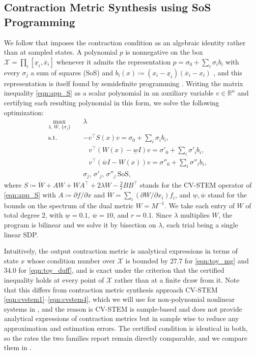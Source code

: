 \documentclass[lettersize,journal]{IEEEtran}
\begin{document}
\subsection{Contraction Metric Synthesis using SoS Programming}
We follow \cite{aylward2008stability} that imposes the contraction condition as an algebraic identity rather than at sampled states. 
A polynomial $p$ is nonnegative on the box $\mathcal{X} = \prod_i [\underline{x}_i, \overline{x}_i]$ 
whenever it admits the representation $p = \sigma_0 + \sum_i \sigma_i b_i$ 
with every $\sigma_j$ a sum of squares (SoS) and $b_i(x) \coloneq (x_i - \underline{x}_i)(\overline{x}_i - x_i)$ \cite{putinar1993positive}, 
and this representation is itself found by semidefinite programming \cite{parrilo2000structured}. 
Writing the matrix inequality \eqref{eqn:app_S} as a scalar polynomial in an auxiliary variable $v \in \mathbb{R}^n$ 
and certifying each resulting polynomial in this form, we solve the following optimization:
\begin{equation}\label{eqn:toy_sos}
    \begin{aligned}
        \max_{\lambda, \, W, \, \{\sigma_j\}} \quad & \lambda \\
        \text{s.t.} \quad
        & -v^\top S(x) v = \sigma_0 + \textstyle\sum_i \sigma_i b_i, \\
        & \;\;\; v^\top (W(x) - \underline{w} I) v = \sigma'_0 + \textstyle\sum_i \sigma'_i b_i, \\
        & \;\;\; v^\top (\overline{w} I - W(x)) v = \sigma''_0 + \textstyle\sum_i \sigma''_i b_i, \\
        & \sigma_j, \, \sigma'_j, \, \sigma''_j \ \text{SoS},
    \end{aligned}
\end{equation}
where $S \coloneq \dot{W} + AW + WA^\top + 2\lambda W - \tfrac{2}{r}BB^\top$ stands for the CV-STEM operator of \eqref{eqn:app_S} 
with $A \coloneq \partial f / \partial x$ and $\dot{W} = \sum_i (\partial W / \partial x_i) f_i$, 
and $\underline{w}, \overline{w}$ stand for the bounds on the spectrum of the dual metric $W = M^{-1}$. 
We take each entry of $W$ of total degree $2$, with $\underline{w} = 0.1$, $\overline{w} = 10$, and $r = 0.1$. 
Since $\lambda$ multiplies $W$, the program is bilinear and we solve it by bisection on $\lambda$, 
each trial being a single linear SDP.

Intuitively, the output contraction metric is analytical expressions in terms of state $x$
whose condition number over $\mathcal{X}$ is bounded by $27.7$ for \eqref{eqn:toy_mg} and $34.0$ for \eqref{eqn:toy_duff},
and is exact under the criterion that the certified inequality holds at every point of $\mathcal{X}$ rather than at a finite draw from it.
Note that this differs from contraction metric synthesis approach CV-STEM \eqref{eqn:cvstem1}--\eqref{eqn:cvstem4}, 
which we will use for non-polynomial nonlinear systems in ,
and the reason is CV-STEM is sample-based and does not provide analytical expressions of contraction metrics
but in sample wise to reduce any approximation and estimation errors.
The certified condition is identical in both, so the rates the two families report remain directly comparable, 
and we compare them in .
\end{document}
